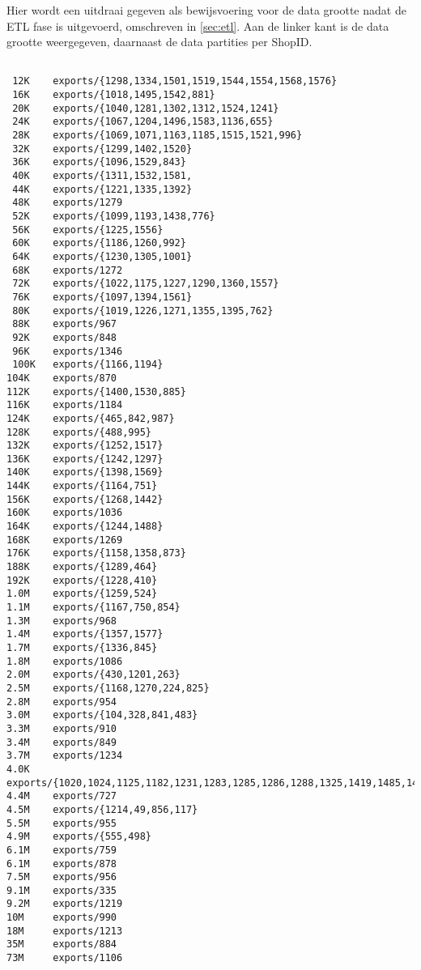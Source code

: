 Hier wordt een uitdraai gegeven als bewijsvoering voor de data grootte nadat de ETL fase is uitgevoerd, omschreven in \ref{sec:etl}. Aan de linker kant is de data grootte weergegeven, daarnaast de data partities per ShopID.

\begin{verbatim}

 12K	exports/{1298,1334,1501,1519,1544,1554,1568,1576}
 16K	exports/{1018,1495,1542,881}
 20K	exports/{1040,1281,1302,1312,1524,1241}
 24K	exports/{1067,1204,1496,1583,1136,655}
 28K	exports/{1069,1071,1163,1185,1515,1521,996}
 32K	exports/{1299,1402,1520}
 36K	exports/{1096,1529,843}
 40K	exports/{1311,1532,1581,
 44K	exports/{1221,1335,1392}
 48K	exports/1279
 52K	exports/{1099,1193,1438,776}
 56K	exports/{1225,1556}
 60K	exports/{1186,1260,992}
 64K	exports/{1230,1305,1001}
 68K	exports/1272
 72K	exports/{1022,1175,1227,1290,1360,1557}
 76K	exports/{1097,1394,1561}
 80K	exports/{1019,1226,1271,1355,1395,762}
 88K	exports/967
 92K	exports/848
 96K	exports/1346
 100K	exports/{1166,1194}
104K	exports/870
112K	exports/{1400,1530,885}
116K	exports/1184
124K	exports/{465,842,987}
128K	exports/{488,995}
132K	exports/{1252,1517}
136K	exports/{1242,1297}
140K	exports/{1398,1569}
144K	exports/{1164,751}
156K	exports/{1268,1442}
160K	exports/1036
164K	exports/{1244,1488}
168K	exports/1269
176K	exports/{1158,1358,873}
188K	exports/{1289,464}
192K	exports/{1228,410}
1.0M	exports/{1259,524}
1.1M	exports/{1167,750,854}
1.3M	exports/968
1.4M	exports/{1357,1577}
1.7M	exports/{1336,845}
1.8M	exports/1086
2.0M	exports/{430,1201,263}
2.5M	exports/{1168,1270,224,825}
2.8M	exports/954
3.0M	exports/{104,328,841,483}
3.3M	exports/910
3.4M	exports/849
3.7M	exports/1234
4.0K	exports/{1020,1024,1125,1182,1231,1283,1285,1286,1288,1325,1419,1485,1491,1493,1498,1506,...}
4.4M	exports/727
4.5M	exports/{1214,49,856,117}
5.5M	exports/955
4.9M	exports/{555,498}
6.1M	exports/759
6.1M	exports/878
7.5M	exports/956
9.1M	exports/335
9.2M	exports/1219
10M	    exports/990
18M	    exports/1213
35M	    exports/884
73M	    exports/1106
\end{verbatim}